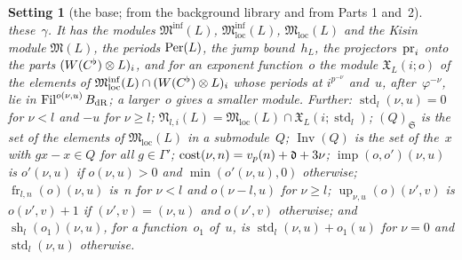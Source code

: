 \documentclass[11pt,a4paper]{article}
\newcommand{\m}[1]{\mbox{$#1$}}        %
\theoremstyle{plainx}
\theoremstyle{uprightx}
\newtheorem{setting}[theorem]{Setting}          %
\providecommand{\Fil}{\operatorname{Fil}}\providecommand{\fS}{\mathfrak{S}}\providecommand{\cE}{\mathcal{E}}
\providecommand{\Minf}{\mathfrak{M}^{\inf}}\providecommand{\Mloc}{\mathfrak{M}_{\mathrm{loc}}}
\providecommand{\Mlocinf}{\mathfrak{M}^{\inf}_{\mathrm{loc}}}\providecommand{\std}{\operatorname{std}}
\providecommand{\cost}[2]{\operatorname{cost}(#1,#2)}
\providecommand{\wExp}[3]{\mathfrak{X}_{#1}(#2;#3)}
\providecommand{\locLP}[2]{\mathfrak{N}_{#1,#2}}
\providecommand{\locKP}[1]{(#1)_{\fS}}
\providecommand{\invMod}[1]{\operatorname{Inv}(#1)}
\providecommand{\impE}[4]{\operatorname{imp}(#1,#2)(#3,#4)}
\providecommand{\frobX}[5]{\operatorname{fr}_{#1,#2}(#3)(#4,#5)}
\providecommand{\raiseX}[5]{\operatorname{up}_{#2,#3}(#1)(#4,#5)}
\providecommand{\shStd}[4]{\operatorname{sh}_{#1}(#2)(#3,#4)}
\begin{document}
\begin{setting}[the base; from the background library and from Parts 1 and~2]
these~$\gamma$. It has the modules \m{\Minf(L)}, \m{\Mlocinf(L)}, \m{\Mloc(L)} and the Kisin module \m{\mathfrak{M}(L)}, the
periods \m{\Per(L)}, the jump bound~$h_L$, the projectors~$\operatorname{pr}_i$ onto the parts \m{(\WC\otimes L)_i}, and for
an exponent function~$o$ the module \m{\wExp{L}{i}{o}} of the elements of $\Mlocinf(L)\cap(\WC\otimes L)_i$
whose periods at \m{i^{p^{-\nu}}} and~$u$, after~$\varphi^{-\nu}$, lie in $\Fil^{o(\nu,u)}\BdR$; a larger~$o$
gives a smaller module. Further: \m{\std_l(\nu,u)=0} for \m{\nu<l} and \m{-u} for \m{\nu\ge l};
$\locLP{l}{i}(L)=\Mloc(L)\cap\wExp{L}{i}{\std_l}$; \m{\locKP{Q}} is the set of the elements of \m{\Mloc(L)} in
a submodule~$Q$; \m{\invMod{Q}} is the set of the~$x$ with \m{gx-x\in Q} for all \m{g\in\Gamma'};
$\cost{\nu}{n}=v_p(n)+\fd+3\nu$; $\impE{o}{o'}{\nu}{u}$ is \m{o'(\nu,u)} if \m{o(\nu,u)>0} and
\m{\min(o'(\nu,u),0)} otherwise; $\frobX{l}{n}{o}{\nu}{u}$ is~$n$ for \m{\nu<l} and \m{o(\nu-l,u)} for
\m{\nu\ge l}; $\raiseX{o}{\nu}{u}{\nu'}{v}$ is \m{o(\nu',v)+1} if \m{(\nu',v)=(\nu,u)} and \m{o(\nu',v)}
otherwise; and $\shStd{l}{o_1}{\nu}{u}$, for a function~$o_1$ of~$u$, is $\std_l(\nu,u)+o_1(u)$ for \m{\nu=0}
and \m{\std_l(\nu,u)} otherwise.


\end{setting}
\end{document}
